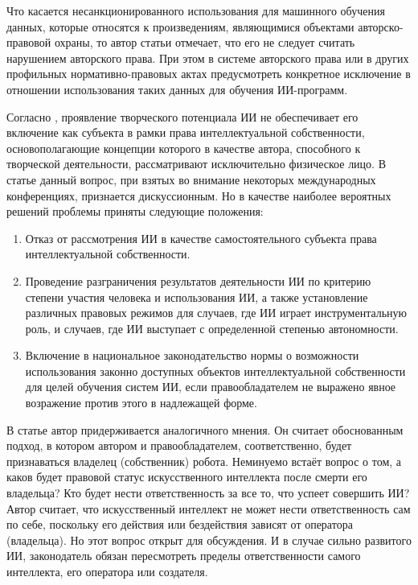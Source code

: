 Что касается несанкционированного использования для машинного обучения данных, которые относятся к произведениям, являющимися
объектами авторско-правовой охраны, то автор статьи \cite{II} отмечает, что его не следует считать нарушением
авторского права. При этом в системе авторского права или в других профильных нормативно-правовых актах
предусмотреть конкретное исключение в отношении использования таких данных для обучения ИИ-программ.

Согласно \cite{chel},
проявление творческого потенциала ИИ не обеспечивает его включение как субъекта в рамки
права интеллектуальной собственности, основополагающие концепции которого в качестве автора,
способного к творческой деятельности, рассматривают исключительно физическое лицо. В статье
\cite{chel} данный вопрос, при взятых во внимание некоторых международных конференциях,
признается дискуссионным. Но в качестве наиболее вероятных решений проблемы приняты следующие положения:

\begin{enumerate}
\item Отказ от рассмотрения ИИ в качестве самостоятельного субъекта права интеллектуальной собственности.
\item Проведение разграничения результатов деятельности ИИ по критерию степени участия человека и
использования ИИ, а также установление различных правовых режимов для случаев, где ИИ играет
инструментальную роль, и случаев, где ИИ выступает с определенной степенью автономности.
\item Включение в национальное законодательство нормы о возможности использования законно
доступных объектов интеллектуальной собственности для целей обучения систем ИИ, если
правообладателем не выражено явное возражение против этого в надлежащей форме.
\end{enumerate}

В статье \cite{probs} автор придерживается аналогичного мнения. Он считает
обоснованным подход, в котором автором и правообладателем, соответственно,
будет признаваться владелец (собственник) робота. Неминуемо встаёт вопрос о том,
а каков будет правовой статус искусственного интеллекта после смерти его владельца?
Кто будет нести ответственность за все то, что успеет совершить ИИ? Автор считает, что
искусственный интеллект не может нести ответственность сам по себе, поскольку его действия
или бездействия зависят от оператора (владельца). Но этот вопрос открыт для обсуждения. И в
случае сильно развитого ИИ, законодатель обязан пересмотреть пределы ответственности самого
интеллекта, его оператора или создателя.

